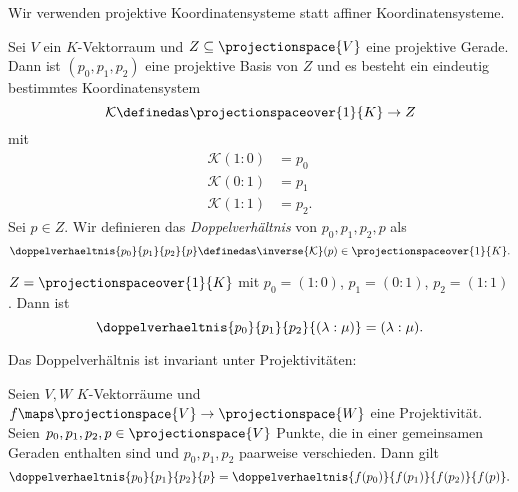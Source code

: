 \begin{idee*}
  Wir verwenden projektive Koordinatensysteme statt affiner Koordinatensysteme.
\end{idee*}
Sei \( V \) ein \( K \)-Vektorraum und \( Z\subseteq \projectionspace{V} \) eine projektive Gerade. Dann ist \( (p_0,p_1,p_2) \)  eine projektive Basis von \( Z \) und es besteht ein eindeutig bestimmtes Koordinatensystem
\begin{equation*}
  \mathcal{K}\definedas \projectionspaceover{1}{K}\to Z
\end{equation*}
mit
\begin{align*}
  \mathcal{K}(1:0)&=p_0\\
  \mathcal{K}(0:1)&=p_1\\
  \mathcal{K}(1:1)&=p_2.
\end{align*}
Sei \( p\in Z \). Wir definieren das \emph{Doppelverhältnis} von \( p_0,p_1,p_2,p \) als
\begin{equation*}
  \doppelverhaeltnis{p_0}{p_1}{p_2}{p}\definedas \inverse{\mathcal{K}}(p)\in \projectionspaceover{1}{K}.
\end{equation*}
\begin{beispiel*}
  \( Z=\projectionspaceover{1}{K} \) mit \( p_0=(1:0) \), \( p_1=(0:1) \), \( p_2=(1:1) \). Dann ist
  \begin{equation*}
    \doppelverhaeltnis{p_0}{p_1}{p_2}{(\lambda:\mu)}=(\lambda:\mu).
  \end{equation*}
\end{beispiel*}
Das Doppelverhältnis ist invariant unter Projektivitäten:
\begin{satz}
  Seien \( V,W \) \( K \)-Vektorräume und \( f\maps \projectionspace{V}\to \projectionspace{W} \) eine Projektivität. Seien \( p_0,p_1,p_2,p\in \projectionspace{V} \) Punkte, die in einer gemeinsamen Geraden enthalten sind und \( p_0,p_1,p_2 \) paarweise verschieden. Dann gilt
  \begin{equation*}
    \doppelverhaeltnis{p_0}{p_1}{p_2}{p}=\doppelverhaeltnis{f(p_0)}{f(p_1)}{f(p_2)}{f(p)}.
  \end{equation*}
\end{satz}
